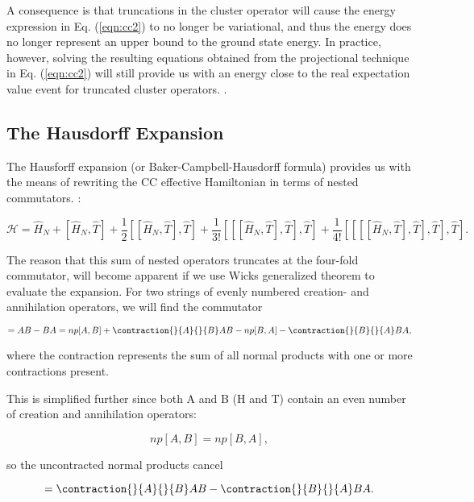 A consequence is that truncations in the cluster operator will cause the energy expression in Eq. (\ref{eqn:cc2}) to no longer be variational, and thus the energy does no longer represent an upper bound to the ground state energy. \cite{CrawfordSchaefer}  In practice, however, solving the resulting equations obtained from the projectional technique in Eq. (\ref{eqn:cc2}) will still provide us with an energy close to the real expectation value event for truncated cluster operators. \cite{CrawfordSchaefer}. 

\subsection{The Hausdorff Expansion}

The Hausforff expansion (or Baker-Campbell-Hausdorff formula) provides us with the means of rewriting the CC effective Hamiltonian in terms of nested commutators. \cite[p.293]{ShavittBartlett2009}:

\begin{equation}
\mathcal{H} = \hat{H}_N + [\hat{H}_N, \hat{T}] + \frac{1}{2} [[\hat{H}_N, \hat{T}], \hat{T}] +  \frac{1}{3!} [[[\hat{H}_N, \hat{T}], \hat{T}], \hat{T}] + \frac{1}{4!} [[[[\hat{H}_N, \hat{T}], \hat{T}], \hat{T}], \hat{T}].
\end{equation}

The reason that this sum of nested operators truncates at the four-fold commutator, will become apparent if we use Wicks generalized theorem to evaluate the expansion. For two strings of evenly numbered creation- and annihilation operators, we will find the commutator

\begin{equation}
[A,B] = AB - BA = np[A,B] + 
\contraction{}{A}{}{B}
AB - np[B,A] - 
\contraction{}{B}{}{A}
BA,
\end{equation}

where the contraction represents the sum of all normal products with one or more contractions present. 

This is simplified further since both A and B (H and T) contain an even number of creation and annihilation operators:

\begin{equation}
np[A,B] = np[B,A],
\end{equation}

so the uncontracted normal products cancel

\begin{equation}
[A,B] =  
\contraction{}{A}{}{B}
AB - 
\contraction{}{B}{}{A}
BA.
\end{equation}

